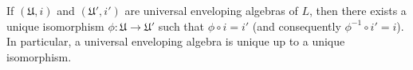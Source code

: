 If $(\mathfrak{U}, i)$ and $(\mathfrak{U}', i')$ are universal enveloping algebras of $L$, then there exists a unique isomorphism $\phi: \mathfrak{U} \to \mathfrak{U}'$ such that $\phi \circ i = i'$ (and consequently $\phi^{-1} \circ i' = i$). In particular, a universal enveloping algebra is unique up to a unique isomorphism.
